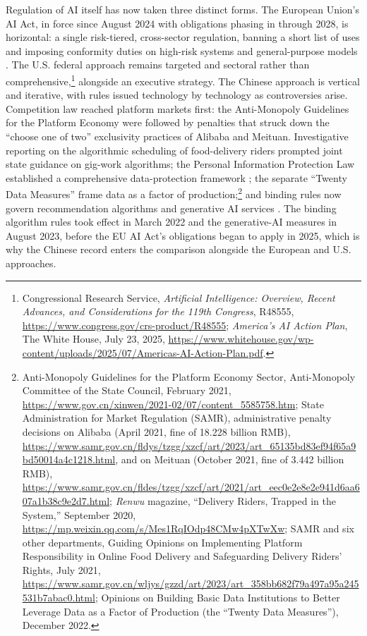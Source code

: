 \documentclass[12pt]{article}
\theoremstyle{plain}
\theoremstyle{definition}
\theoremstyle{remark}
\begin{document}
Regulation of AI itself has now taken three distinct forms. The
European Union's AI Act, in force since August
2024 with obligations phasing in through 2028, is horizontal: a single
risk-tiered, cross-sector regulation, banning a short list of
uses and imposing conformity duties on high-risk systems and
general-purpose models \citep{EUAIAct2024}. The U.S. federal approach
remains targeted and sectoral rather than comprehensive,\footnote{%
Congressional Research Service, \emph{Artificial Intelligence: Overview,
Recent Advances, and Considerations for the 119th Congress}, R48555,
\url{https://www.congress.gov/crs-product/R48555}; \emph{America's AI
Action Plan}, The White House, July 23, 2025,
\url{https://www.whitehouse.gov/wp-content/uploads/2025/07/Americas-AI-Action-Plan.pdf}.}
alongside an executive strategy. The
Chinese approach is vertical and iterative, with rules issued technology by
technology as controversies arise. Competition law reached platform
markets first: the Anti-Monopoly Guidelines for the Platform Economy
were followed by penalties that struck down the ``choose one of two''
exclusivity practices of Alibaba and Meituan. Investigative reporting on
the algorithmic scheduling of food-delivery riders prompted joint state
guidance on gig-work algorithms; the Personal Information Protection Law
established a comprehensive data-protection framework \citep{PIPL2021};
the separate ``Twenty Data Measures'' frame data as a factor of
production;\footnote{\raggedright
Anti-Monopoly Guidelines for the Platform Economy Sector, Anti-Monopoly
Committee of the State Council, February 2021,
\url{https://www.gov.cn/xinwen/2021-02/07/content_5585758.htm};
State Administration for Market Regulation (SAMR), administrative
penalty decisions on Alibaba (April 2021, fine of 18.228 billion RMB),
\url{https://www.samr.gov.cn/fldys/tzgg/xzcf/art/2023/art_65135bd83ef94f65a9bd50014a4c1218.html},
and on Meituan (October 2021, fine of 3.442 billion RMB),
\url{https://www.samr.gov.cn/fldes/tzgg/xzcf/art/2021/art_eec0e2e8e2e941d6aa607a1b38c9e2d7.html};
\emph{Renwu} magazine, ``Delivery Riders, Trapped in the System,''
September 2020, \url{https://mp.weixin.qq.com/s/Mes1RqIOdp48CMw4pXTwXw};
SAMR and six other departments, Guiding Opinions on Implementing
Platform Responsibility in Online Food Delivery and Safeguarding
Delivery Riders' Rights, July 2021,
\url{https://www.samr.gov.cn/wljys/gzzd/art/2023/art_358bb682f79a497a95a245531b7abac0.html};
Opinions on Building Basic Data Institutions to Better Leverage Data as
a Factor of Production (the ``Twenty Data Measures''), December 2022.}
and binding rules now govern
recommendation algorithms \citep{AlgorithmRecRegulation2022} and
generative AI services \citep{CAC2023GenAI}. The binding algorithm
rules took effect in March 2022 and the generative-AI measures in
August 2023, before the EU AI Act's obligations began to apply in 2025,
which is why the Chinese record enters the comparison alongside the
European and U.S. approaches.
\end{document}
